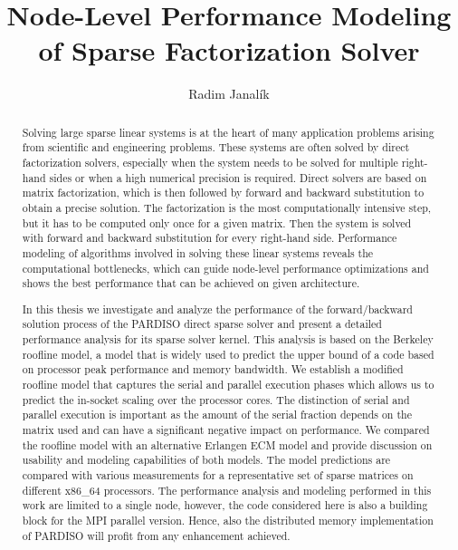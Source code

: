 \documentclass[]{usiinfthesis}
\title{Node-Level Performance Modeling \\of Sparse Factorization Solver} %
\author{Radim Janal\'ik} %
\begin{document}
\maketitle %

\frontmatter %

\begin{abstract}
Solving large sparse linear systems is at the heart of many application problems arising from scientific and engineering problems. These systems are often solved by direct factorization solvers, especially when the system needs to be solved for multiple right-hand sides or when a high numerical precision is required.
Direct solvers are based on matrix factorization, which is then followed by forward and backward substitution to obtain a precise solution. The factorization is the most computationally intensive step, but it has to be computed only once for a given matrix. Then the system is solved with forward and backward substitution for every right-hand side.
Performance modeling of algorithms involved in solving these linear systems reveals the computational bottlenecks, which can guide node-level performance optimizations and shows the best performance that can be achieved on given architecture.

In this thesis we investigate and analyze the performance of the forward/backward solution process of the PARDISO direct sparse solver and present
a detailed performance analysis for its sparse solver kernel. This analysis is based on the Berkeley roofline model, a model that is widely used to predict the upper bound of a code based on processor peak performance and memory bandwidth. We establish a modified roofline model that captures the serial and parallel execution phases which allows us to predict the in-socket scaling over the processor cores. The distinction of serial and parallel execution is important as the amount of the serial fraction depends on the matrix used and can have a significant negative impact on performance.
We compared the roofline model with an alternative Erlangen ECM model and provide discussion on usability and modeling capabilities of both models.
The model predictions are compared with various measurements for a representative set of sparse matrices on different x86\_64 processors.
The performance analysis and modeling performed in this work are limited to a single node, however, the code considered here is also a building block for the
   MPI parallel version. Hence, also the distributed memory implementation of PARDISO will profit from any enhancement achieved.
\end{abstract}
\end{document}
